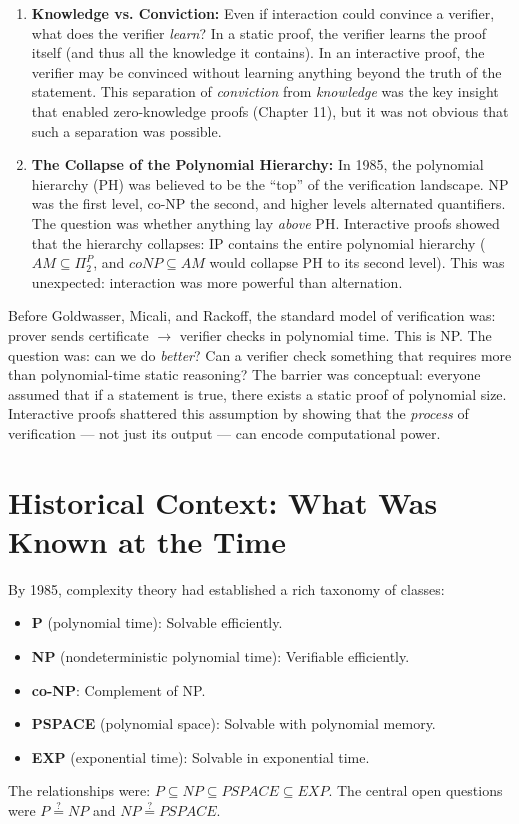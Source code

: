 \begin{enumerate}
\item \textbf{Knowledge vs. Conviction:} Even if interaction could convince a verifier, what does the verifier \emph{learn}? In a static proof, the verifier learns the proof itself (and thus all the knowledge it contains). In an interactive proof, the verifier may be convinced without learning anything beyond the truth of the statement. This separation of \emph{conviction} from \emph{knowledge} was the key insight that enabled zero-knowledge proofs (Chapter 11), but it was not obvious that such a separation was possible.

\item \textbf{The Collapse of the Polynomial Hierarchy:} In 1985, the polynomial hierarchy (PH) was believed to be the ``top'' of the verification landscape. NP was the first level, co-NP the second, and higher levels alternated quantifiers. The question was whether anything lay \emph{above} PH. Interactive proofs showed that the hierarchy collapses: IP contains the entire polynomial hierarchy ($AM \subseteq \Pi_2^P$, and $coNP \subseteq AM$ would collapse PH to its second level). This was unexpected: interaction was more powerful than alternation.
\end{enumerate}

Before Goldwasser, Micali, and Rackoff, the standard model of verification was: prover sends certificate $\to$ verifier checks in polynomial time. This is NP. The question was: can we do \emph{better}? Can a verifier check something that requires more than polynomial-time static reasoning? The barrier was conceptual: everyone assumed that if a statement is true, there exists a static proof of polynomial size. Interactive proofs shattered this assumption by showing that the \emph{process} of verification --- not just its output --- can encode computational power.

\section{Historical Context: What Was Known at the Time}
\label{sec:ip:context}

By 1985, complexity theory had established a rich taxonomy of classes:
\begin{itemize}
\item \textbf{P} (polynomial time): Solvable efficiently.
\item \textbf{NP} (nondeterministic polynomial time): Verifiable efficiently.
\item \textbf{co-NP}: Complement of NP.
\item \textbf{PSPACE} (polynomial space): Solvable with polynomial memory.
\item \textbf{EXP} (exponential time): Solvable in exponential time.
\end{itemize}
The relationships were: $P \subseteq NP \subseteq PSPACE \subseteq EXP$. The central open questions were $P \stackrel{?}{=} NP$ and $NP \stackrel{?}{=} PSPACE$.

